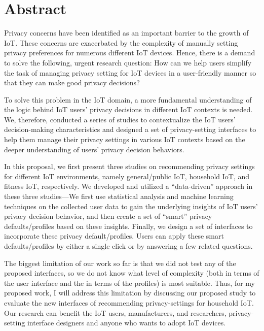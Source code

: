 \chapter*{Abstract}
Privacy concerns have been identified as an important barrier to the growth of IoT. These concerns are exacerbated by the complexity of manually setting privacy preferences for numerous different IoT devices. Hence, there is a demand to solve the following, urgent research question: How can we help users simplify the task of managing privacy setting for IoT devices in a user-friendly manner so that they can make good privacy decisions?

To solve this problem in the IoT domain, a more fundamental understanding of the logic behind IoT users' privacy decisions in different IoT contexts is needed. We, therefore, conducted a series of studies to contextualize the IoT users' decision-making characteristics and designed a set of privacy-setting interfaces to help them manage their privacy settings in various IoT contexts based on the deeper understanding of users' privacy decision behaviors. 

In this proposal, we first present three studies on recommending privacy settings for different IoT environments, namely general/public IoT, household IoT, and fitness IoT, respectively. We developed and utilized a ``data-driven” approach in these three studies—We first use statistical analysis and machine learning techniques on the collected user data to gain the underlying insights of IoT users' privacy decision behavior, and then create a set of ``smart” privacy defaults/profiles based on these insights. Finally, we design a set of interfaces to incorporate these privacy default/profiles. Users can apply these smart defaults/profiles by either a single click or by answering a few related questions.

The biggest limitation of our work so far is that we did not test any of the proposed interfaces, so we do not know what level of complexity (both in terms of the user interface and the in terms of the profiles) is most suitable. Thus, for my proposed work, I will address this limitation by discussing our proposed study to evaluate the new interfaces of recommending privacy-settings for household IoT. Our research can benefit the IoT users, manufacturers, and researchers, privacy-setting interface designers and anyone who wants to adopt IoT devices.

